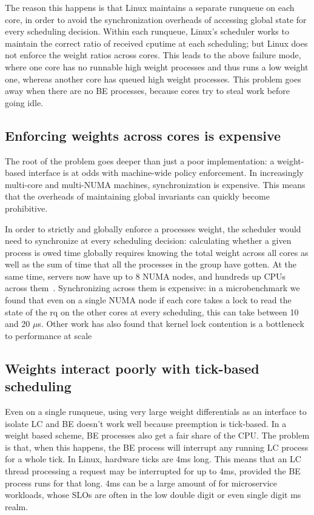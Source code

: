 The reason this happens is that Linux maintains a separate runqueue on each
core, in order to avoid the synchronization overheads of accessing global state
for every scheduling decision. Within each runqueue, Linux's scheduler works to maintain the
correct ratio of received cputime at each scheduling; but Linux does not enforce
the weight ratios across cores. This leads to the above failure mode, where one
core has no runnable high weight processes and thus runs a low weight one,
whereas another core has queued high weight processes. This problem goes away
when there are no BE processes, because cores try to steal work before going
idle.

\subsection{Enforcing weights across cores is expensive}\label{ss:cross-core-hard}

The root of the problem goes deeper than just a poor implementation: a
weight-based interface is at odds with machine-wide policy enforcement. In
increasingly multi-core and multi-NUMA machines, synchronization is expensive.
This means that the overheads of maintaining global invariants can quickly
become prohibitive.

In order to strictly and globally enforce a processes weight, the scheduler
would need to synchronize at every scheduling decision: calculating whether a
given process is owed time globally requires knowing the total weight across all
cores as well as the sum of time that all the processes in the group have
gotten. At the same time, servers now have up to 8 NUMA nodes, and hundreds up
CPUs across them~\cite{TODO}. Synchronizing across them is expensive: in a
microbenchmark we found that even on a single NUMA node if each core takes a
lock to read the state of the rq on the other cores at every scheduling, this
can take between 10 and 20 $\mu$s. Other work has also found that kernel lock
contention is a bottleneck to performance at scale~\cite{TODO}


\subsection{Weights interact poorly with tick-based scheduling}\label{ss:quantum}

Even on a single runqueue, using very large weight differentials as an interface
to isolate LC and BE doesn't work well because preemption is tick-based. In a
weight based scheme, BE processes also get a fair share of the CPU. The problem
is that, when this happens, the BE process will interrupt any running LC process
for a whole tick. In Linux, hardware ticks are 4ms long. This means that an LC
thread processing a request may be interrupted for up to 4ms, provided the BE
process runs for that long. 4ms can be a large amount of for microservice
workloads, whose SLOs are often in the low double digit or even single digit ms
realm.~\cite{TODO}




